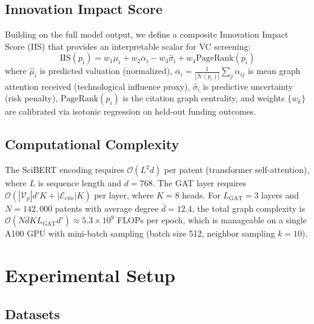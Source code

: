 \documentclass[journal]{IEEEtran}
\begin{document}
\subsection{Innovation Impact Score}

Building on the full model output, we define a composite Innovation Impact Score (IIS) that provides an interpretable scalar for VC screening:
\begin{equation}
    \text{IIS}(p_i) = w_1 \hat{\mu}_i + w_2 \overline{\alpha}_i - w_3 \hat{\sigma}_i + w_4 \text{PageRank}(p_i)
    \label{eq:iis}
\end{equation}
where $\hat{\mu}_i$ is predicted valuation (normalized), $\overline{\alpha}_i = \frac{1}{|\mathcal{N}(p_i)|}\sum_{j}\alpha_{ij}$ is mean graph attention received (technological influence proxy), $\hat{\sigma}_i$ is predictive uncertainty (risk penalty), $\text{PageRank}(p_i)$ is the citation graph centrality, and weights $\{w_k\}$ are calibrated via isotonic regression on held-out funding outcomes.

\subsection{Computational Complexity}

The SciBERT encoding requires $\mathcal{O}(L^2 d)$ per patent (transformer self-attention), where $L$ is sequence length and $d=768$. The GAT layer requires $\mathcal{O}(|\mathcal{V}_p| d' K + |\mathcal{E}_{\text{cite}}| K)$ per layer, where $K=8$ heads. For $L_{\text{GAT}}=3$ layers and $N=142{,}000$ patents with average degree $\bar{d}=12.4$, the total graph complexity is $\mathcal{O}(N \bar{d} K L_{\text{GAT}} d') \approx 5.3 \times 10^9$ FLOPs per epoch, which is manageable on a single A100 GPU with mini-batch sampling (batch size 512, neighbor sampling $k=10$).

\section{Experimental Setup}

\subsection{Datasets}
\end{document}
